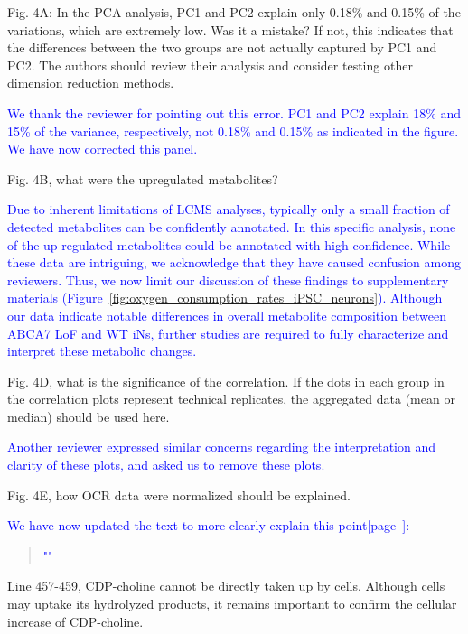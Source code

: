 Fig. 4A: In the PCA analysis, PC1 and PC2 explain only 0.18\% and 0.15\% of the variations, which are extremely low. Was it a mistake? If not, this indicates that the differences between the two groups are not actually captured by PC1 and PC2. The authors should review their analysis and consider testing other dimension reduction methods.

\textcolor{blue}{We thank the reviewer for pointing out this error. PC1 and PC2 explain 18\% and 15\% of the variance, respectively, not 0.18\% and 0.15\% as indicated in the figure. We have now corrected this panel.}

Fig. 4B, what were the upregulated metabolites?

\textcolor{blue}{Due to inherent limitations of LCMS analyses, typically only a small fraction of detected metabolites can be confidently annotated. In this specific analysis, none of the up-regulated metabolites could be annotated with high confidence. While these data are intriguing, we acknowledge that they have caused confusion among reviewers. Thus, we now limit our discussion of these findings to supplementary materials (Figure~\ref{fig:oxygen_consumption_rates_iPSC_neurons}). Although our data indicate notable differences in overall metabolite composition between ABCA7 LoF and WT iNs, further studies are required to fully characterize and interpret these metabolic changes.}

Fig. 4D, what is the significance of the correlation. If the dots in each group in the correlation plots represent technical replicates, the aggregated data (mean or median) should be used here.

\textcolor{blue}{Another reviewer expressed similar concerns regarding the interpretation and clarity of these plots, and asked us to remove these plots.}

Fig. 4E, how OCR data were normalized should be explained.

\textcolor{blue}{We have now updated the text to more clearly explain this point[page~\pageref{quoteC-label}]:}
\begin{quote}
	\textcolor{blue}{"\quoteC"}
\end{quote}

Line 457-459, CDP-choline cannot be directly taken up by cells. Although cells may uptake its hydrolyzed products, it remains important to confirm the cellular increase of CDP-choline.


